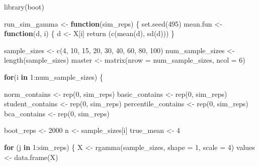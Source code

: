 \documentclass[12pt]{article}
\newenvironment{Shaded}{\begin{snugshade}}{\end{snugshade}}
\newcommand{\AttributeTok}[1]{\textcolor[rgb]{0.77,0.63,0.00}{#1}}
\newcommand{\ControlFlowTok}[1]{\textcolor[rgb]{0.13,0.29,0.53}{\textbf{#1}}}
\newcommand{\DecValTok}[1]{\textcolor[rgb]{0.00,0.00,0.81}{#1}}
\newcommand{\FunctionTok}[1]{\textcolor[rgb]{0.00,0.00,0.00}{#1}}
\newcommand{\NormalTok}[1]{#1}
\newcommand{\OtherTok}[1]{\textcolor[rgb]{0.56,0.35,0.01}{#1}}
\newcommand{\SpecialCharTok}[1]{\textcolor[rgb]{0.00,0.00,0.00}{#1}}
\begin{document}
\begin{Shaded}
\begin{Highlighting}[]
\FunctionTok{library}\NormalTok{(boot)}

\NormalTok{run\_sim\_gamma }\OtherTok{\textless{}{-}} \ControlFlowTok{function}\NormalTok{(sim\_reps) \{}
  \FunctionTok{set.seed}\NormalTok{(}\DecValTok{495}\NormalTok{)}
\NormalTok{  mean.fun }\OtherTok{\textless{}{-}} \ControlFlowTok{function}\NormalTok{(d, i) \{}
\NormalTok{    d }\OtherTok{\textless{}{-}}\NormalTok{ X[i]}
    \FunctionTok{return}\NormalTok{ (}\FunctionTok{c}\NormalTok{(}\FunctionTok{mean}\NormalTok{(d), }\FunctionTok{sd}\NormalTok{(d)))}
\NormalTok{  \}}
  
\NormalTok{  sample\_sizes }\OtherTok{\textless{}{-}} \FunctionTok{c}\NormalTok{(}\DecValTok{4}\NormalTok{, }\DecValTok{10}\NormalTok{, }\DecValTok{15}\NormalTok{, }\DecValTok{20}\NormalTok{, }\DecValTok{30}\NormalTok{, }\DecValTok{40}\NormalTok{, }\DecValTok{60}\NormalTok{, }\DecValTok{80}\NormalTok{, }\DecValTok{100}\NormalTok{)}
\NormalTok{  num\_sample\_sizes }\OtherTok{\textless{}{-}} \FunctionTok{length}\NormalTok{(sample\_sizes)}
\NormalTok{  master }\OtherTok{\textless{}{-}} \FunctionTok{matrix}\NormalTok{(}\AttributeTok{nrow =}\NormalTok{ num\_sample\_sizes, }\AttributeTok{ncol =} \DecValTok{6}\NormalTok{)}
  
  \ControlFlowTok{for}\NormalTok{(i }\ControlFlowTok{in} \DecValTok{1}\SpecialCharTok{:}\NormalTok{num\_sample\_sizes) \{}
  
\NormalTok{    norm\_contains }\OtherTok{\textless{}{-}} \FunctionTok{rep}\NormalTok{(}\DecValTok{0}\NormalTok{, sim\_reps)}
\NormalTok{    basic\_contains }\OtherTok{\textless{}{-}} \FunctionTok{rep}\NormalTok{(}\DecValTok{0}\NormalTok{, sim\_reps)}
\NormalTok{    student\_contains }\OtherTok{\textless{}{-}} \FunctionTok{rep}\NormalTok{(}\DecValTok{0}\NormalTok{, sim\_reps)}
\NormalTok{    percentile\_contains }\OtherTok{\textless{}{-}} \FunctionTok{rep}\NormalTok{(}\DecValTok{0}\NormalTok{, sim\_reps)}
\NormalTok{    bca\_contains }\OtherTok{\textless{}{-}} \FunctionTok{rep}\NormalTok{(}\DecValTok{0}\NormalTok{, sim\_reps)}
    
\NormalTok{    boot\_reps }\OtherTok{\textless{}{-}} \DecValTok{2000}
\NormalTok{    n }\OtherTok{\textless{}{-}}\NormalTok{ sample\_sizes[i]}
\NormalTok{    true\_mean }\OtherTok{\textless{}{-}} \DecValTok{4}
    
    \ControlFlowTok{for}\NormalTok{ (j }\ControlFlowTok{in} \DecValTok{1}\SpecialCharTok{:}\NormalTok{sim\_reps) \{}
\NormalTok{      X }\OtherTok{\textless{}{-}} \FunctionTok{rgamma}\NormalTok{(sample\_sizes, }\AttributeTok{shape =} \DecValTok{1}\NormalTok{, }\AttributeTok{scale =} \DecValTok{4}\NormalTok{)}
\NormalTok{      values }\OtherTok{\textless{}{-}} \FunctionTok{data.frame}\NormalTok{(X)}
    

\end{Highlighting}
\end{Shaded}
\end{document}
